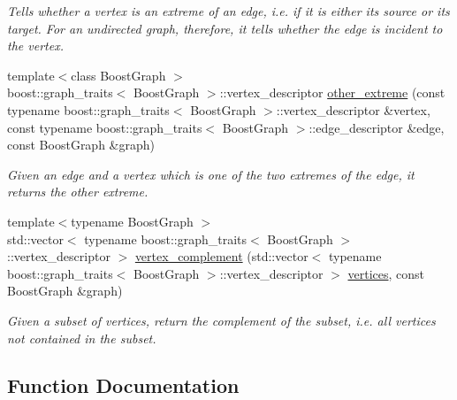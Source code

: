 \begin{DoxyCompactItemize}
\begin{DoxyCompactList}\small\item\em Tells whether a vertex is an extreme of an edge, i.\+e. if it is either its source or its target. For an undirected graph, therefore, it tells whether the edge is incident to the vertex. \end{DoxyCompactList}\item 
{\footnotesize template$<$class Boost\+Graph $>$ }\\boost\+::graph\+\_\+traits$<$ Boost\+Graph $>$\+::vertex\+\_\+descriptor \hyperlink{namespaceas_1_1graph_a592c192d63c1c42820da78708adb9e61}{other\+\_\+extreme} (const typename boost\+::graph\+\_\+traits$<$ Boost\+Graph $>$\+::vertex\+\_\+descriptor \&vertex, const typename boost\+::graph\+\_\+traits$<$ Boost\+Graph $>$\+::edge\+\_\+descriptor \&edge, const Boost\+Graph \&graph)
\begin{DoxyCompactList}\small\item\em Given an edge and a vertex which is one of the two extremes of the edge, it returns the other extreme. \end{DoxyCompactList}\item 
{\footnotesize template$<$typename Boost\+Graph $>$ }\\std\+::vector$<$ typename boost\+::graph\+\_\+traits$<$ Boost\+Graph $>$\+::vertex\+\_\+descriptor $>$ \hyperlink{namespaceas_1_1graph_aec6bce35a79299f552d227442f399580}{vertex\+\_\+complement} (std\+::vector$<$ typename boost\+::graph\+\_\+traits$<$ Boost\+Graph $>$\+::vertex\+\_\+descriptor $>$ \hyperlink{namespaceas_1_1graph_ab93ee208eb116d3a3349c8de8cc91445}{vertices}, const Boost\+Graph \&graph)
\begin{DoxyCompactList}\small\item\em Given a subset of vertices, return the complement of the subset, i.\+e. all vertices not contained in the subset. \end{DoxyCompactList}\end{DoxyCompactItemize}


\subsection{Function Documentation}
\mbox{\label{namespaceas_1_1graph_ae44b728c4acaf47bc2bb010831df9452}} 
